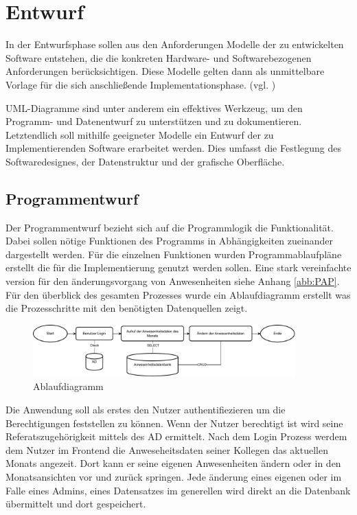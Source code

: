 \section{Entwurf}
\label{sec:Entwurf}
In der Entwurfsphase sollen aus den Anforderungen Modelle der zu entwickelten Software entstehen, die die konkreten Hardware- und Softwarebezogenen Anforderungen berücksichtigen. Diese Modelle gelten dann als unmittelbare Vorlage für die sich anschließende Implementationsphase. (vgl. \cite[S. 69]{dumke-2003})

UML-Diagramme sind unter anderem ein effektives Werkzeug, um den Programm- und Datenentwurf zu unterstützen und zu dokumentieren. Letztendlich soll mithilfe geeigneter Modelle ein Entwurf der zu Implementierenden Software erarbeitet werden. Dies umfasst die Festlegung des Softwaredesignes, der Datenstruktur und der grafische Oberfläche.

\subsection{Programmentwurf}
\label{sec:Programmentwurf}
Der Programmentwurf bezieht sich auf die Programmlogik \bzw die Funktionalität. Dabei sollen nötige Funktionen des Programms in Abhängigkeiten zueinander dargestellt werden. Für die einzelnen Funktionen wurden Programmablaufpläne erstellt die für die Implementierung genutzt werden sollen. Eine stark vereinfachte version für den änderungsvorgang von Anwesenheiten siehe Anhang \ref{abb:PAP}. Für den überblick des gesamten Prozesses wurde ein Ablaufdiagramm erstellt was die Prozesschritte mit den benötigten Datenquellen zeigt.

\begin{figure}[htb]
    \centering
    \includegraphics[width=0.9\textwidth,angle=0]{abb/Flow-Diagramm.drawio.pdf}
    \caption[Beschreibung]{Ablaufdiagramm}
    \label{abb:Flow}
\end{figure}

Die Anwendung soll als erstes den Nutzer authentifiezieren um die Berechtigungen feststellen zu können. Wenn der Nutzer berechtigt ist wird seine Referatszugehörigkeit mittels des AD ermittelt. Nach dem Login Prozess werdem dem Nutzer im Frontend die Anweseheitsdaten seiner Kollegen das aktuellen Monats angezeit. Dort kann er seine eigenen Anwesenheiten ändern oder in den Monatsansichten vor und zurück springen. Jede änderung eines eigenen oder im Falle eines Admins, eines Datensatzes im generellen wird direkt an die Datenbank übermittelt und dort gespeichert.


